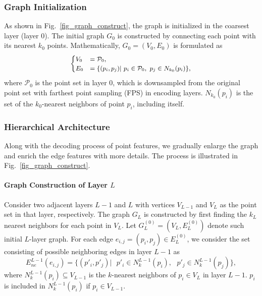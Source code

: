 \documentclass[10pt,twocolumn,letterpaper]{article}
\begin{document}
\subsubsection{Graph Initialization}
As shown in Fig.~\ref{fig_graph_construct}, the graph is initialized in the coarsest layer (layer 0). 
The initial graph $G_0$ is constructed by connecting each point with its nearest $k_0$ points. 
Mathematically, $G_0 = (V_0, E_0)$ is formulated as 
\begin{equation} \small
\begin{aligned}
\begin{cases}
V_0 &= \mathcal{P}_0, \\
E_0 &= \{(p_i, p_j) | \text{ } p_i \in \mathcal{P}_0, \text{ } p_j \in N_{k_0}(p_i)\},
\end{cases}
\end{aligned}
\end{equation}
where $\mathcal{P}_0$ is the point set in layer 0, which is downsampled from the original point set with farthest point sampling (FPS) in encoding layers. $N_{k_0}(p_i)$ is the set of the $k_0$-nearest neighbors of point $p_i$, including itself.

\subsubsection{Hierarchical Architecture}
Along with the decoding process of point features, we gradually enlarge the graph and enrich the edge features with more details. The process is illustrated in Fig.~\ref{fig_graph_construct}.
\vspace{-0.12in}
\paragraph{Graph Construction of Layer $L$}
Consider two adjacent layers $L-1$ and $L$ with vertices $V_{L-1}$ and $V_{L}$ as the point set in that layer, respectively.
The graph $G_L$ is constructed by first finding the $k_L$ nearest neighbors for each point in $V_{L}$.
Let $G_{L}^{(0)}=(V_L, E_L^{(0)})$ denote such initial $L$-layer graph. For each edge $e_{i, j} = (p_i, p_j) \in E_L^{(0)}$, we consider the set consisting of possible neighboring edges in layer $L-1$ as
\begin{equation}
E_{ne}^{L-1}(e_{i, j}) = \{(p'_i, p'_j) | \text{ }p'_i \in N_k^{L-1}(p_i),  \text{ }p'_j \in N_k^{L-1}(p_j)\}, \nonumber 
\end{equation}
where $N_k^{L-1}(p_i) \subseteq V_{L-1}$ is the $k$-nearest neighbors of $p_i \in V_L$ in layer $L-1$. $p_i$ is included in $N_k^{L-1}(p_i)$ if $p_i \in V_{L-1}$.
\end{document}

